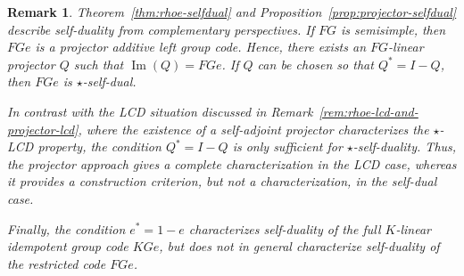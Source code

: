 \documentclass[11pt]{article}
\newtheorem{remark}[theorem]{Remark}
\begin{document}






\begin{remark}\label{rem:rhoe-selfdual-and-projector-selfdual}
Theorem~\ref{thm:rhoe-selfdual} and
Proposition~\ref{prop:projector-selfdual} describe self-duality from
complementary perspectives. If $FG$ is semisimple, then $FGe$ is a projector
additive left group code. Hence, there exists an $FG$-linear projector $Q$
such that $\operatorname{Im}(Q)=FGe$. If $Q$ can be chosen so that
$Q^*=I-Q$, then $FGe$ is $\star$-self-dual.

In contrast with the LCD situation discussed in
Remark~\ref{rem:rhoe-lcd-and-projector-lcd}, where the existence of a
self-adjoint projector characterizes the $\star$-LCD property, the condition
$Q^*=I-Q$ is only sufficient for $\star$-self-duality. Thus, the projector
approach gives a complete characterization in the LCD case, whereas it
provides a construction criterion, but not a characterization, in the
self-dual case.

Finally, the condition $e^*=1-e$ characterizes self-duality of the full
$K$-linear idempotent group code $KGe$, but does not in general characterize
self-duality of the restricted code $FGe$.
\end{remark}
\end{document}
